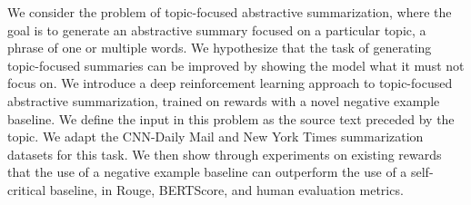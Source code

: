 We consider the problem of topic-focused abstractive summarization, where the goal is to generate an abstractive summary focused on a particular topic, a phrase of one or multiple words. We hypothesize that the task of generating topic-focused summaries can be improved by showing the model what it must not focus on. We introduce a deep reinforcement learning approach to topic-focused abstractive summarization, trained on rewards with a novel negative example baseline. We define the input in this problem as the source text preceded by the topic. We adapt the CNN-Daily Mail and New York Times summarization datasets for this task. We then show through experiments on existing rewards that the use of a negative example baseline can outperform the use of a self-critical baseline, in Rouge, BERTScore, and human evaluation metrics.
